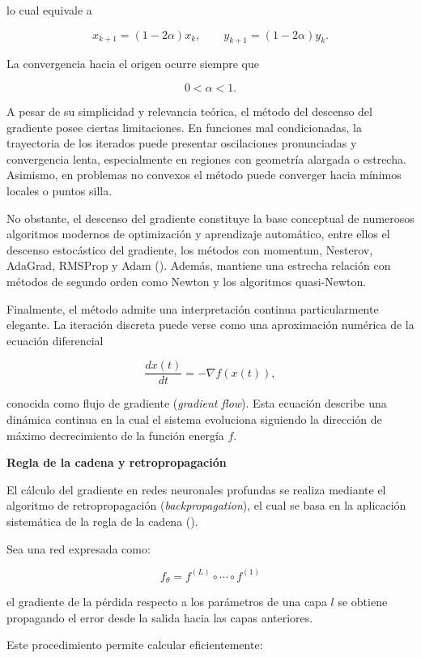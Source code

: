 \documentclass[
  spanish,
  us-letterpaper,
]{scrreprt}
\theoremstyle{definition}
\theoremstyle{remark}
\begin{document}
lo cual equivale a

\[
x_{k+1} = (1 - 2\alpha)x_k,
\qquad
y_{k+1} = (1 - 2\alpha)y_k.
\]

La convergencia hacia el origen ocurre siempre que

\[
0 < \alpha < 1.
\]

A pesar de su simplicidad y relevancia teórica, el método del descenso
del gradiente posee ciertas limitaciones. En funciones mal
condicionadas, la trayectoria de los iterados puede presentar
oscilaciones pronunciadas y convergencia lenta, especialmente en
regiones con geometría alargada o estrecha. Asimismo, en problemas no
convexos el método puede converger hacia mínimos locales o puntos silla.

No obstante, el descenso del gradiente constituye la base conceptual de
numerosos algoritmos modernos de optimización y aprendizaje automático,
entre ellos el descenso estocástico del gradiente, los métodos con
momentum, Nesterov, AdaGrad, RMSProp y Adam
(). Además, mantiene una
estrecha relación con métodos de segundo orden como Newton y los
algoritmos quasi-Newton.

Finalmente, el método admite una interpretación continua particularmente
elegante. La iteración discreta puede verse como una aproximación
numérica de la ecuación diferencial

\[
\frac{dx(t)}{dt} = -\nabla f(x(t)),
\]

conocida como flujo de gradiente (\emph{gradient flow}). Esta ecuación
describe una dinámica continua en la cual el sistema evoluciona
siguiendo la dirección de máximo decrecimiento de la función energía
\(f\).

\textbf{Regla de la cadena y retropropagación}

El cálculo del gradiente en redes neuronales profundas se realiza
mediante el algoritmo de retropropagación (\emph{backpropagation}), el
cual se basa en la aplicación sistemática de la regla de la cadena
().

Sea una red expresada como:

\[
f_\theta = f^{(L)} \circ \cdots \circ f^{(1)}
\]

el gradiente de la pérdida respecto a los parámetros de una capa \(l\)
se obtiene propagando el error desde la salida hacia las capas
anteriores.

Este procedimiento permite calcular eficientemente:
\end{document}

